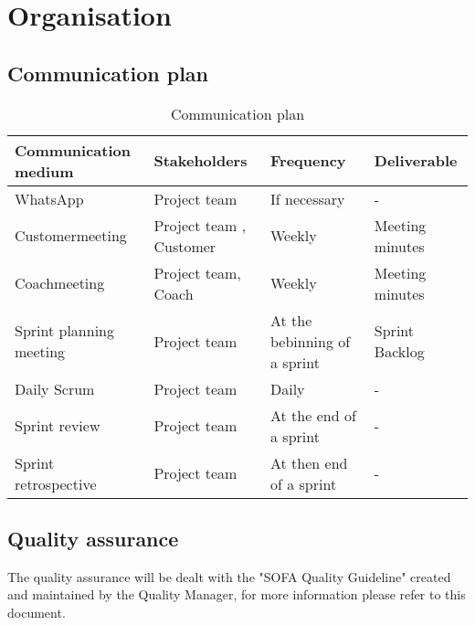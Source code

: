 \section{Organisation}

    \subsection{Communication plan}
    \begin{table}[H]
        \begin{tabularx}{\textwidth}{|X|X|X|X|}
        	\hline
            \textbf{Communication medium} & \textbf{Stakeholders} & \textbf{Frequency} & \textbf{Deliverable} \\ \hline \hline
            WhatsApp & Project team & If necessary & - \\ \hline
            Customermeeting & Project team , Customer & Weekly & Meeting minutes \\ \hline
            Coachmeeting & Project team, Coach & Weekly & Meeting minutes \\ \hline
            Sprint planning meeting & Project team & At the bebinning of a sprint & Sprint Backlog \\ \hline
            Daily Scrum & Project team & Daily & - \\ \hline 
            Sprint review & Project team & At the end of a sprint & - \\ \hline
            Sprint retrospective & Project team & At then end of a sprint & - \\ \hline
        \end{tabularx}
        \caption{Communication plan}
    \end{table}

    \subsection{Quality assurance}
    The quality assurance will be dealt with the "SOFA Quality Guideline" created and maintained by the Quality Manager, for 
    more information please refer to this document.

